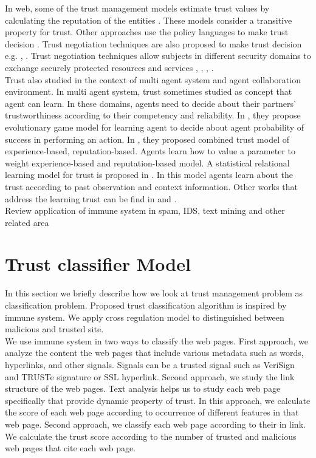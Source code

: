 \documentclass{llncs}
\begin{document}
In web, some of the trust management models estimate trust values by calculating the reputation of the entities \cite{reputationWeb}. These models consider a transitive property for trust.  Other approaches  use the policy languages to make trust decision \cite{trustpolicy}.  Trust negotiation techniques are also proposed to make trust decision e.g. \cite{Winslett}, \cite{Winslett2}. Trust negotiation techniques allow subjects in different security domains to exchange securely protected resources and services \cite{Squicciarini}, \cite{Koshutanski}, \cite{Winsborough}, \cite{Winsborough2}. \\

Trust also studied in the context of multi agent system and agent collaboration environment. In multi agent system, trust sometimes studied as concept that agent can learn. In these domains, agents need to decide about their partners’ trustworthiness according to their competency and reliability.  In \cite{competent}, they propose evolutionary game model for learning agent
to decide about agent probability of success in performing an action. In \cite{experince}, they proposed combined trust model of experience-based, reputation-based. Agents learn how to value a parameter to weight experience-based and reputation-based model.  A statistical relational learning model for trust is proposed in \cite{statistical}. In this model agents learn about the trust according to past observation and context information. 
Other works that address the learning trust can be find in \cite{inittrust} and \cite{taskspecific}.\\





Review application of  immune system in spam, IDS, text mining and other related area


\section{Trust classifier Model }
In this section we briefly describe how we look at trust management problem as classification problem. Proposed trust classification algorithm is inspired by immune system. We apply cross regulation model \cite{carneiro} to distinguished between malicious and trusted site.\\
We use immune system in two ways to classify the web pages. First approach, we analyze the content the web pages that include various metadata such as words, hyperlinks, and other signals. Signals can be a trusted signal such as VeriSign and TRUSTe signature or SSL hyperlink. Second approach, we study the link structure of the web pages.  Text analysis helps us to study each web page specifically that provide dynamic property of trust. In this approach, we calculate the score of each web page according to occurrence of different features in that web page. Second approach, we classify each web page according to their in link. We calculate the trust score according to the number of trusted and malicious web pages that cite each web page.\\
\end{document}
